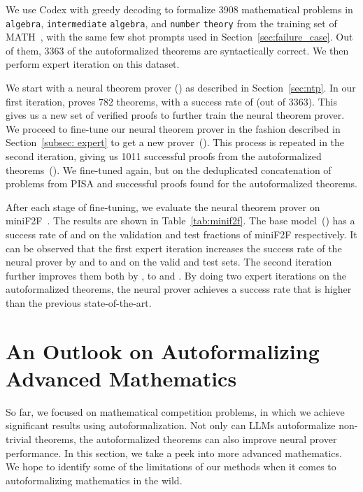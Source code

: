 \documentclass{article}
\begin{document}
We use Codex with greedy decoding to formalize 3908 mathematical problems in \texttt{algebra}, \texttt{intermediate} \texttt{algebra}, and \texttt{number} \texttt{theory} from the training set of MATH~\citep{hendrycks2021math}, with the same few shot prompts used in Section~\ref{sec:failure_case}. Out of them, 3363 of the autoformalized theorems are syntactically correct. We then perform expert iteration on this dataset. 

We start with a neural theorem prover () as described in Section~\ref{sec:ntp}. In our first iteration,  proves 782 theorems, with a success rate of  (out of 3363). This gives us a new set of verified proofs to further train the neural theorem prover. We proceed to fine-tune our neural theorem prover in the fashion described in Section~\ref{subsec: expert} to get a new prover~(). This process is repeated in the second iteration, giving us 1011 successful proofs from the autoformalized theorems~(). We fine-tuned  again, but on the deduplicated concatenation of problems from PISA and successful proofs found for the autoformalized theorems.

After each stage of fine-tuning, we evaluate the neural theorem prover on miniF2F~\citep{zheng2021minif2f}. The results are shown in Table~\ref{tab:minif2f}. The base model~() has a success rate of  and  on the validation and test fractions of miniF2F respectively. It can be observed that the first expert iteration increases the success rate of the neural prover by  and  to  and  on the valid and test sets. The second iteration further improves them both by , to  and . By doing two expert iterations on the autoformalized theorems, the neural prover achieves a success rate that is  higher than the previous state-of-the-art.










\section{An Outlook on Autoformalizing Advanced Mathematics}

So far, we focused on mathematical competition problems, in which we achieve significant results using autoformalization. Not only can LLMs autoformalize non-trivial theorems, the autoformalized theorems can also improve neural prover performance. In this section, we take a peek into more advanced mathematics. We hope to identify some of the limitations of our methods when it comes to autoformalizing mathematics in the wild.
\end{document}
